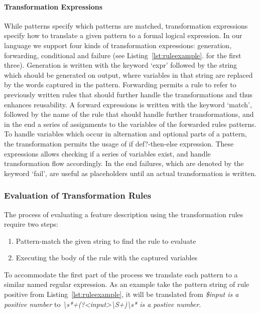 \paragraph{Transformation Expressions}
\label{par:Transformation Expressions}
While patterns specify which patterns are matched, transformation expressions
specify how to translate a given pattern to a formal logical expression.
In our language we support four kinds of transformation expressions:
generation, forwarding, conditional and failure (see Listing~\ref{lst:ruleexample}. for the first three).
Generation is written with the keyword `expr'
followed by the string which should be generated on output, where variables
in that string are replaced by the words captured in the pattern.
Forwarding permits a rule to refer to previously written rules that should further handle the
transformations and thus enhances reusability.
A forward expressions is written with the keyword `match',
followed by the name of the rule that should handle further transformations,
and in the end a series of assignments to the variables of the forwarded
rules patterns.
To handle variables which occur in alternation and optional parts of a
pattern, the transformation permits the usage of if def?-then-else expression.
These expressions allows checking if a series of variables exist,
and handle transformation flow accordingly.
In the end failures, which are denoted by the keyword `fail',
are useful as placeholders until an actual transformation is written.

\subsubsection{Evaluation of Transformation Rules}
\label{sub:Evaluation of Transformation Rules}

The process of evaluating a feature description using the transformation rules require two steps:
\begin{enumerate}
  \item Pattern-match the given string to find the rule to evaluate
  \item Executing the body of the rule with the captured variables
\end{enumerate}
To accommodate the first part of the process we translate each pattern to a
similar named regular expression. As an example take the pattern string of rule positive from Listing~\ref{lst:ruleexample}, it will be translated 
from \textit{\$input is a positive number} to \textit{\textbackslash s*+(?\textless input\textgreater\textbackslash S+)\textbackslash s* is a postive number}.

